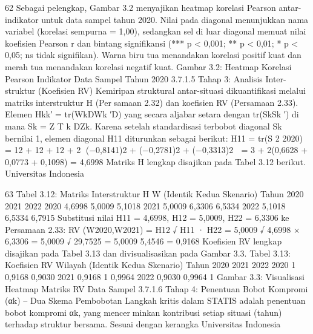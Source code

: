62
Sebagai pelengkap, Gambar 3.2 menyajikan heatmap korelasi Pearson antar-indikator
untuk data sampel tahun 2020. Nilai pada diagonal menunjukkan nama variabel (korelasi
sempurna = 1,00), sedangkan sel di luar diagonal memuat nilai koefisien Pearson r dan
bintang signifikansi (*** p < 0,001; ** p < 0,01; * p < 0,05; ns tidak signifikan). Warna
biru tua menandakan korelasi positif kuat dan merah tua menandakan korelasi negatif kuat.
Gambar 3.2: Heatmap Korelasi Pearson Indikator Data Sampel Tahun 2020
3.7.1.5 Tahap 3: Analisis Inter-struktur (Koefisien RV)
Kemiripan struktural antar-situasi dikuantifikasi melalui matriks interstruktur H (Persamaan 2.32) dan koefisien RV (Persamaan 2.33). Elemen Hkk′ = tr(WkDWk
′D) yang
secara aljabar setara dengan tr(SkSk
′) di mana Sk = Z
T
k DZk. Karena setelah standardisasi
terbobot diagonal Sk bernilai 1, elemen diagonal H11 diturunkan sebagai berikut:
H11 = tr(S
2
2020) = 12 + 12 + 12 + 2
(−0,8141)2 + (−0,2781)2 + (−0,3313)2

= 3 + 2(0,6628 + 0,0773 + 0,1098) = 4,6998
Matriks H lengkap disajikan pada Tabel 3.12 berikut.
Universitas Indonesia

63
Tabel 3.12: Matriks Interstruktur H W (Identik Kedua Skenario)
Tahun 2020 2021 2022
2020 4,6998 5,0009 5,1018
2021 5,0009 6,3306 6,5334
2022 5,1018 6,5334 6,7915
Substitusi nilai H11 = 4,6998, H12 = 5,0009, H22 = 6,3306 ke Persamaan 2.33:
RV (W2020,W2021) = H12
√
H11 · H22
=
5,0009
√
4,6998 × 6,3306
=
5,0009
√
29,7525
=
5,0009
5,4546
= 0,9168
Koefisien RV lengkap disajikan pada Tabel 3.13 dan divisualisasikan pada Gambar 3.3.
Tabel 3.13: Koefisien RV Wilayah (Identik Kedua Skenario)
Tahun 2020 2021 2022
2020 1 0,9168 0,9030
2021 0,9168 1 0,9964
2022 0,9030 0,9964 1
Gambar 3.3: Visualisasi Heatmap Matriks RV Data Sampel
3.7.1.6 Tahap 4: Penentuan Bobot Kompromi (αk) – Dua Skema Pembobotan
Langkah kritis dalam STATIS adalah penentuan bobot kompromi αk, yang mencerminkan kontribusi setiap situasi (tahun) terhadap struktur bersama. Sesuai dengan kerangka
Universitas Indonesia

